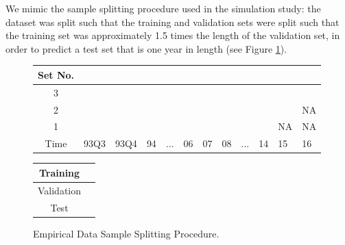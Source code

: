 \documentclass{article}
\begin{document}
We mimic the sample splitting procedure used in the simulation study: the dataset was split such that the training and validation sets were split such that the training set was approximately 1.5 times the length of the validation set, in order to predict a test set that is one year in length (see Figure \ref{emp_sample_split_diag}).
\begin{figure}[!htb]
	\fontsize{6}{8}\selectfont
	\begin{center}
		\begin{tabular}{|c|p{0.55cm}p{0.55cm}p{0.50cm}p{0.50cm}p{0.50cm}p{0.50cm}p{0.50cm}p{0.50cm}p{0.50cm}p{0.50cm}p{0.50cm}|}
			\hline
			Set No. &&&&&&&&&&& \\
			\hline
			3 & \cellcolor{cyan} & \cellcolor{cyan} & \cellcolor{cyan} & \cellcolor{cyan} & \cellcolor{cyan} & \cellcolor{cyan} & 
			\cellcolor{pink} & \cellcolor{pink} & \cellcolor{pink} & \cellcolor{pink} &  \cellcolor{olive} \\
			2 & \cellcolor{cyan} & \cellcolor{cyan} & \cellcolor{cyan} & \cellcolor{cyan} & \cellcolor{cyan} & 
			\cellcolor{pink} & \cellcolor{pink} & \cellcolor{pink} & \cellcolor{pink} & 	
			\cellcolor{olive} & NA \\
			1 & \cellcolor{cyan} & \cellcolor{cyan} & \cellcolor{cyan} & \cellcolor{cyan} & 
			\cellcolor{pink} & \cellcolor{pink} & \cellcolor{pink} & \cellcolor{pink} &
			\cellcolor{olive} & NA & NA \\
			\hline
			Time & 93Q3 & 93Q4 & 94 & ... & 06 & 07 & 08 & ... & 14 & 15 & 16 \\
			\hline
		\end{tabular}
		\medskip
		\begin{tabular}{|c|p{0.55cm}|}
			\hline
			Training & \cellcolor{cyan} \\
			\hline
			Validation & \cellcolor{pink} \\
			\hline
			Test & \cellcolor{olive} \\
			\hline
		\end{tabular}
	\end{center}
	\caption{Empirical Data Sample Splitting Procedure.}
	\label{emp_sample_split_diag}
\end{figure}

\end{document}
